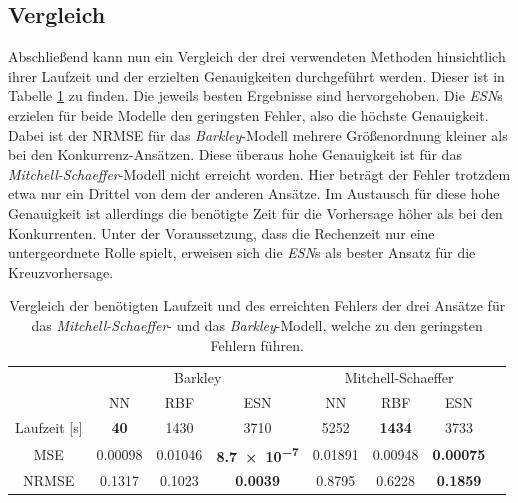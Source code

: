 \FloatBarrier
\subsection{Vergleich}
Abschließend kann nun ein Vergleich der drei verwendeten Methoden hinsichtlich ihrer Laufzeit und der erzielten Genauigkeiten durchgeführt werden. Dieser ist in Tabelle \ref{tab:exp_cross_comparison_results} zu finden. Die jeweils  besten Ergebnisse sind hervorgehoben. Die \textit{ESN}s erzielen für beide Modelle den geringsten Fehler, also die höchste Genauigkeit. Dabei ist der NRMSE für das \textit{Barkley}-Modell mehrere Größenordnung kleiner als bei den Konkurrenz-Ansätzen. Diese überaus hohe Genauigkeit ist für das \textit{Mitchell-Schaeffer}-Modell nicht erreicht worden. Hier beträgt der Fehler trotzdem etwa nur ein Drittel von dem der anderen Ansätze. Im Austausch für diese hohe Genauigkeit ist allerdings die benötigte Zeit für die Vorhersage höher als bei den Konkurrenten. Unter der Voraussetzung, dass die Rechenzeit nur eine untergeordnete Rolle spielt, erweisen sich die \textit{ESN}s als bester Ansatz für die Kreuzvorhersage.
\begin{table}[h]
	\centering
	\captionsetup{width=0.9\linewidth}
	\begin{tabular}{cccccccc}
		\hline		
		\multicolumn{1}{c}{} & \multicolumn{3}{c}{Barkley} & \multicolumn{3}{c}{Mitchell-Schaeffer}		\\
		\multicolumn{1}{c}{} & NN & RBF & ESN & NN & RBF & ESN \\
		
		\hline
		
		Laufzeit [s] 	& \textbf{40} 		& 1430		& 3710		& 5252		& \textbf{1434} 		& 3733 \\
		MSE 			& 0.00098	& 0.01046	& \textbf{\num{8.7e-7}} 	& 0.01891	& 0.00948 	& \textbf{0.00075} \\
		NRMSE 			& 0.1317	& 0.1023	& \textbf{\num{0.0039}} 	& 0.8795	& 0.6228 	& \textbf{0.1859} \\
		\hline 
	\end{tabular} 
	\caption{Vergleich der benötigten Laufzeit und des erreichten Fehlers der drei Ansätze für das \textit{Mitchell-Schaeffer}- und das \textit{Barkley}-Modell, welche zu den geringsten Fehlern führen.}
	\label{tab:exp_cross_comparison_results}
\end{table}

\FloatBarrier